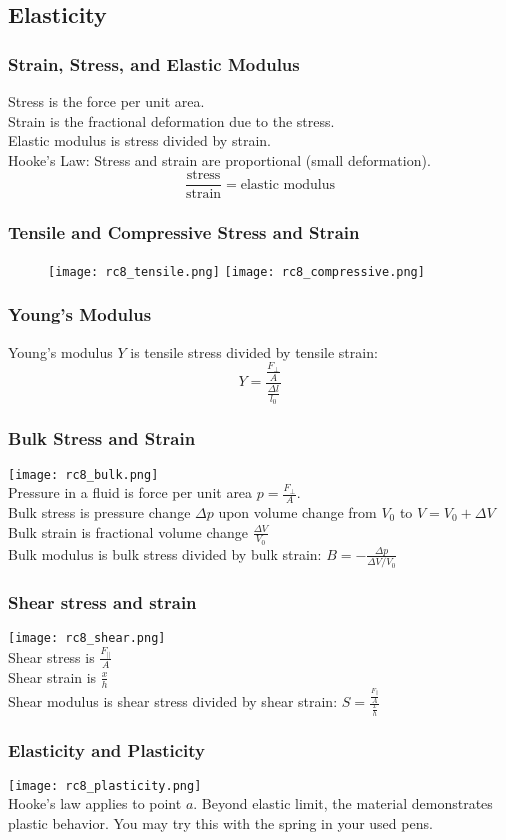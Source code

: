 \subsection{Elasticity}
\begin{frame}
\frametitle{Strain, Stress, and Elastic Modulus}
\alert{Stress} is the force per unit area.\\
\alert{Strain} is the fractional deformation due to the stress.\\
\alert{Elastic modulus} is stress divided by strain.\\
\alert{Hooke's Law:} Stress and strain are proportional (small deformation).
\[\frac{\text{stress}}{\text{strain}}=\text{elastic modulus}\]
\end{frame}
\begin{frame}
\frametitle{Tensile and Compressive Stress and Strain}
\begin{figure}
\texttt{[image: rc8\_tensile.png]}
\texttt{[image: rc8\_compressive.png]}
\end{figure}
\end{frame}
\begin{frame}
\frametitle{Young's Modulus}
Young's modulus $Y$ is tensile \alert{stress} divided by tensile \alert{strain}:
\[Y=\frac{\frac{F_{\perp}}{A}}{\frac{\Delta l}{l_0}}\]
\end{frame}
\begin{frame}
\frametitle{Bulk Stress and Strain}
\begin{multicols}{2}
\texttt{[image: rc8\_bulk.png]}\\
\alert{Pressure} in a fluid is force per unit area $p=\frac{F_{\perp}}{A}$.\\
\alert{Bulk stress} is pressure change $\Delta p$ upon volume change from $V_0$ to $V=V_0+\Delta V$\\
\alert{Bulk strain} is fractional volume change $\frac{\Delta V}{V_0}$\\
\alert{Bulk modulus} is bulk stress divided by bulk strain: $B=-\frac{\Delta p}{\Delta V/V_0}$
\end{multicols}
\end{frame}
\begin{frame}
\frametitle{Shear stress and strain}
\begin{multicols}{2}
\texttt{[image: rc8\_shear.png]}\\
\alert{Shear stress} is $\frac{F_{\parallel}}{A}$\\
\alert{Shear strain} is $\frac{x}{h}$\\
\alert{Shear modulus} is shear stress divided by shear strain: $S=\frac{\frac{F_{\parallel}}{A}}{\frac{x}{h}}$
\end{multicols}
\end{frame}
\begin{frame}
\frametitle{Elasticity and Plasticity}
\texttt{[image: rc8\_plasticity.png]}\\
Hooke's law applies to point $a$. Beyond elastic limit, the material demonstrates plastic behavior. You may try this with the spring in your used pens.
\end{frame}
